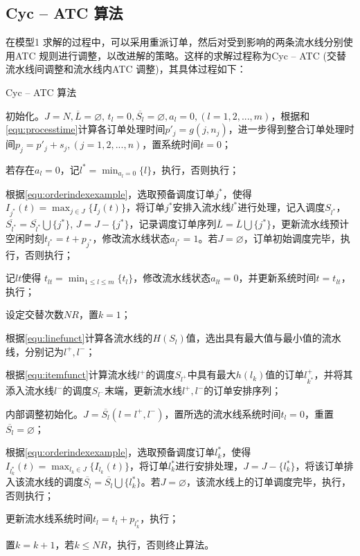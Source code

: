 \subsection{Cyc -- ATC 算法}
在模型1 求解的过程中，可以采用重派订单，然后对受到影响的两条流水线分别使用ATC 规则进行调整，以改进解的策略。这样的求解过程称为Cyc -- ATC (交替流水线间调整和流水线内ATC 调整)，其具体过程如下：
\begin{algori}
Cyc -- ATC 算法\label{alg:cycatc}
\begin{asparaenum}
\renewcommand{\labelenumi}{\bf Step\theenumi~}
\item 初始化。$J = N, \overline{L} = \varnothing$, $t_l = 0, \overline{S_l} = \varnothing, a_l=0, (l = 1,2,...,m)$，根据和\eqref{equ:processtime}计算各订单处理时间$p'_j = g(j, n_j)$，进一步得到整合订单处理时间$p_j = p'_j + s_j, (j = 1,2,...,n)$，置系统时间$t = 0$；
\item 若存在$a_l = 0$，记$l^* = \displaystyle\min_{a_l = 0}\{l\}$，执行，否则执行；
\item 根据\eqref{equ:orderindexexample}，选取预备调度订单$j^*$，使得$I_{j^*}(t) = \displaystyle\max_{j\in J}\{I_j(t)\}$，将订单$j^*$安排入流水线$l^*$进行处理，记入调度$S_{l^*}$，$\overline{S_{l^*}}=\overline{S_{l^*}}\bigcup \{j^*\}$, $J = J -\{j^*\}$，记录调度订单序列$\overline{L} = \overline{L} \bigcup \{j^*\}$，更新流水线预计空闲时刻$t_{l^*} = t + p_{j^*}$，修改流水线状态$a_{l^*} = 1$。若$J = \varnothing$，订单初始调度完毕，执行，否则执行；
\item 记$lt$使得 $t_{lt} = \displaystyle\min_{1\le l\le m}\{t_l\}$，修改流水线状态$a_{lt} = 0$，并更新系统时间$t = t_{lt}$，执行；
\item 设定交替次数$NR$，置$k = 1$；
\item 根据\eqref{equ:linefunct}计算各流水线的$H(S_l)$值，选出具有最大值与最小值的流水线，分别记为$l^+, l^-$；
\item 根据\eqref{equ:itemfunct}计算流水线$l^+$的调度$S_{l^+}$中具有最大$h(l_k)$值的订单$l^+_{k^*}$，并将其添入流水线$l^-$的调度$S_{l^-}$末端，更新流水线$l^+, l^-$的订单安排序列；
\item 内部调整初始化。$J = \overline{S_l}(l = l^+, l^-)$，置所选的流水线系统时间$t_l = 0$，重置$\overline{S_l} = \varnothing$；
\item 根据\eqref{equ:orderindexexample}，选取预备调度订单$l_k^*$，使得$I_{l_k^*}(t) = \displaystyle\max_{l_k\in J}\{I_{l_k}(t)\}$，将订单$l_k^*$进行安排处理，$J = J -\{l_k^*\}$，将该订单排入该流水线的调度$\overline{S_l} = \overline{S_l}\bigcup \{l_k^*\} $。若$J = \varnothing$，该流水线上的订单调度完毕，执行，否则执行；
\item 更新流水线系统时间$t_l = t_l + p_{l_k^*}$，执行；
\item 置$k = k+1$，若$k\le NR$，执行，否则终止算法。
\end{asparaenum}
\end{algori}

